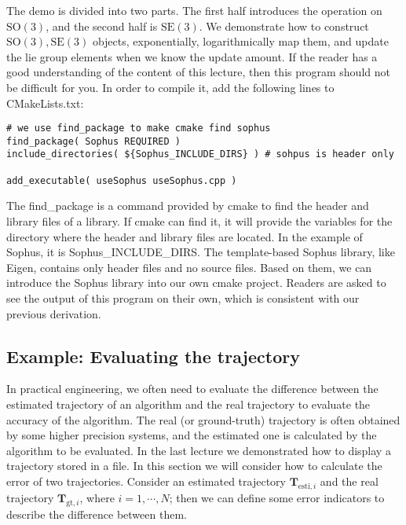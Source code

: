 The demo is divided into two parts. The first half introduces the operation on $\mathrm{SO}(3)$, and the second half is $\mathrm{SE}(3)$. We demonstrate how to construct $\mathrm{SO}(3), \mathrm{SE}(3)$ objects, exponentially, logarithmically map them, and update the lie group elements when we know the update amount. If the reader has a good understanding of the content of this lecture, then this program should not be difficult for you. In order to compile it, add the following lines to CMakeLists.txt:

\begin{lstlisting}[caption=slambook/ch4/useSophus/CMakeLists.txt]
# we use find_package to make cmake find sophus
find_package( Sophus REQUIRED )
include_directories( ${Sophus_INCLUDE_DIRS} ) # sohpus is header only

add_executable( useSophus useSophus.cpp )
\end{lstlisting}

The find\_package is a command provided by cmake to find the header and library files of a library. If cmake can find it, it will provide the variables for the directory where the header and library files are located. In the example of Sophus, it is Sophus\_INCLUDE\_DIRS. The template-based Sophus library, like Eigen, contains only header files and no source files. Based on them, we can introduce the Sophus library into our own cmake project. Readers are asked to see the output of this program on their own, which is consistent with our previous derivation.

\subsection{Example: Evaluating the trajectory}
In practical engineering, we often need to evaluate the difference between the estimated trajectory of an algorithm and the real trajectory to evaluate the accuracy of the algorithm. The real (or ground-truth) trajectory is often obtained by some higher precision systems, and the estimated one is calculated by the algorithm to be evaluated. In the last lecture we demonstrated how to display a trajectory stored in a file. In this section we will consider how to calculate the error of two trajectories. Consider an estimated trajectory $\mathbf{T}_{\mathrm{esti}, i}$ and the real trajectory $\mathbf{T}_{\mathrm{gt},i}$, where $i=1,\cdots, N$; then we can define some error indicators to describe the difference between them.

